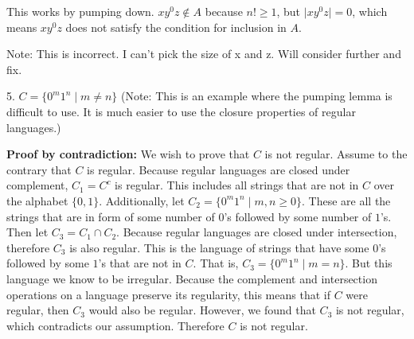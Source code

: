 \documentclass[12pt,letterpaper,final]{report}
\begin{document}
This works by pumping down. $xy^0z \not \in A$ because $n! \ge 1$, but $\vert xy^0z\vert = 0$, which means $xy^0z$ does not satisfy the condition for inclusion in $A$.

Note: This is incorrect. I can't pick the size of x and z. Will consider further and fix.

\medskip

5. 	$C = \{0^m1^n  \mid  m \not= n \}$ (Note: This is an example where the pumping lemma is difficult to use.   It is much easier to use the closure properties of regular languages.)

{\bf Proof by contradiction:} We wish to prove that $C$ is not regular. Assume to the contrary that $C$ is regular. Because regular languages are closed under complement, $C_1 = C^c$ is regular. This includes all strings that are not in $C$ over the alphabet $\{0,1\}$. Additionally, let $C_2 = \{0^m1^n \mid m, n \ge 0\}$. These are all the strings that are in form of some number of $0$'s followed by some number of $1$'s. Then let $C_3 = C_1 \cap C_2$. Because regular languages are closed under intersection, therefore $C_3$ is also regular. This is the language of strings that have some $0$'s followed by some $1$'s that are not in $C$. That is, $C_3 = \{0^m1^n  \mid  m = n \}$. But this language we know to be irregular. Because the complement and intersection operations on a language preserve its regularity, this means that if $C$ were regular, then $C_3$ would also be regular. However, we found that $C_3$ is not regular, which contradicts our assumption. Therefore $C$ is not regular.
\medskip



\medskip
\end{document}
